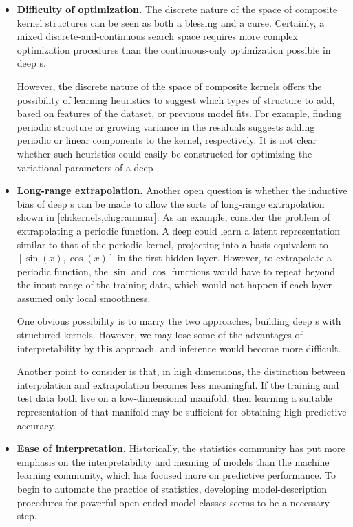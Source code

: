 \begin{itemize}

\item {\bf Difficulty of optimization.}
The discrete nature of the space of composite kernel structures can be seen as both a blessing and a curse.
Certainly, a mixed discrete-and-continuous search space requires more complex optimization procedures than the continuous-only optimization possible in deep \gp{}s.

However, the discrete nature of the space of composite kernels offers the possibility of learning heuristics to suggest which types of structure to add, based on features of the dataset, or previous model fits.
For example, finding periodic structure or growing variance in the residuals suggests adding periodic or linear components to the kernel, respectively.
It is not clear whether such heuristics could easily be constructed for optimizing the variational parameters of a deep \gp{}.

\item {\bf Long-range extrapolation.}
Another open question is whether the inductive bias of deep \gp{}s can be made to allow the sorts of long-range extrapolation shown in \cref{ch:kernels,ch:grammar}.
As an example, consider the problem of extrapolating a periodic function.
A deep \gp{} could learn a latent representation similar to that of the periodic kernel, projecting into a basis equivalent to $[\sin(x), \cos(x)]$ in the first hidden layer.
However, to extrapolate a periodic function, the $\sin$ and $\cos$ functions would have to repeat beyond the input range of the training data, which would not happen if each layer assumed only local smoothness.

One obvious possibility is to marry the two approaches, building deep \gp{}s with structured kernels.
However, we may lose some of the advantages of interpretability by this approach, and inference would become more difficult.

Another point to consider is that, in high dimensions, the distinction between interpolation and extrapolation becomes less meaningful.
If the training and test data both live on a low-dimensional manifold, then learning a suitable representation of that manifold may be sufficient for obtaining high predictive accuracy.

\item {\bf Ease of interpretation.}
Historically, the statistics community has put more emphasis on the interpretability and meaning of models than the machine learning community, which has focused more on predictive performance.
To begin to automate the practice of statistics, developing model-description procedures for powerful open-ended model classes seems to be a necessary step. %


\end{itemize}
